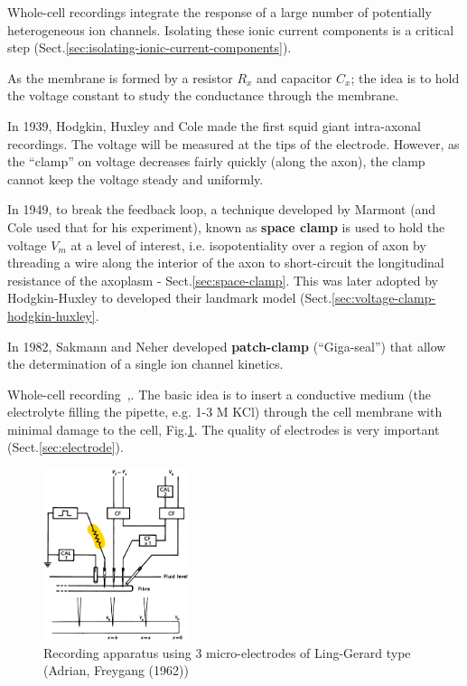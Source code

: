 Whole-cell recordings integrate the response of a large number of potentially
heterogeneous ion channels. Isolating these ionic current components is a
critical step (Sect.\ref{sec:isolating-ionic-current-components}).

As the membrane is formed by a resistor $R_x$ and capacitor $C_x$; the idea is
to hold the voltage constant to study the conductance through the membrane.

In 1939, Hodgkin, Huxley and Cole made the first squid giant intra-axonal
recordings. The voltage will be measured at the tips of the electrode.  However,
as the ``clamp'' on voltage decreases fairly quickly (along the axon), the clamp
cannot keep the voltage steady and uniformly.

In 1949, to break the feedback loop, a technique developed by Marmont (and Cole
used that for his experiment), known as {\bf space clamp} is used to hold the
voltage $V_m$ at a level of interest, i.e. isopotentiality over a region of axon
by threading a wire along the interior of the axon to short-circuit the
longitudinal resistance of the axoplasm - Sect.\ref{sec:space-clamp}. This was
later adopted by Hodgkin-Huxley to developed their landmark model
(Sect.\ref{sec:voltage-clamp-hodgkin-huxley}.



In 1982, Sakmann and Neher developed {\bf patch-clamp} (``Giga-seal'') that
allow the determination of a single ion channel kinetics\cite{fishmann1975pvc}.


Whole-cell recording~\cite{kay1986ans},\cite{numann1987ocs}.
The basic idea is to insert a conductive medium (the electrolyte filling the
pipette, e.g. 1-3 M KCl) through the cell membrane with minimal damage to the
cell, Fig.\ref{fig:Ling-Gerard-3-electrodes}. The quality of electrodes is very
important (Sect.\ref{sec:electrode}).


  \begin{figure}[htb]
    \centerline{\includegraphics[height=5cm]{./images/Ling-Gerard-3-electrodes.eps}}
    \caption{Recording apparatus using 3 micro-electrodes of Ling-Gerard type
    (Adrian, Freygang (1962)) }\label{fig:Ling-Gerard-3-electrodes}
  \end{figure}

